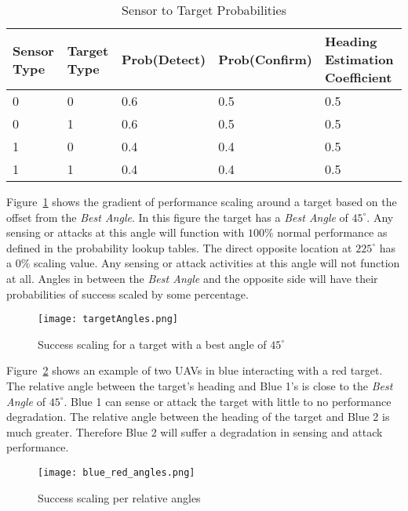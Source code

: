 \begin{table}[H]
	\caption{Sensor to Target Probabilities}
	\centering
	\label{tab:snsrTgtProb}
	\begin{tabular}{|p{1cm}|p{1cm}|p{1cm}|p{1cm}|p{1cm}|}
		\hline
		Sensor Type & Target Type & Prob(Detect) & Prob(Confirm) & Heading Estimation Coefficient\\ \hline
		0 & 0 & 0.6 & 0.5 & 0.5 \\
		0 & 1 & 0.6 & 0.5 & 0.5 \\
		1 & 0 & 0.4 & 0.4 & 0.5 \\
		1 & 1 & 0.4 & 0.4 & 0.5 \\
		\hline
	\end{tabular}
\end{table}

Figure~\ref{fig:targetAngles} shows the gradient of performance scaling around a target based on the offset from the \textit{Best Angle}.  In this figure the target has a \textit{Best Angle} of $45^{\circ}$.  Any sensing or attacks at this angle will function with $100\%$ normal performance as defined in the probability lookup tables.  The direct opposite location at $225^{\circ}$ has a $0\%$ scaling value.  Any sensing or attack activities at this angle will not function at all.  Angles in between the \textit{Best Angle} and the opposite side will have their probabilities of success scaled by some percentage.


\begin{figure}[H]
	\centering
	\texttt{[image: targetAngles.png]}
	\caption{Success scaling for a target with a best angle of $45^{\circ}$}
	\label{fig:targetAngles}
\end{figure}

Figure~\ref{fig:blue_red_angles} shows an example of two UAVs in blue interacting with a red target.  The relative angle between the target's heading and Blue 1's is close to the \textit{Best Angle} of $45^{\circ}$.  Blue 1 can sense or attack the target with little to no performance degradation.  The relative angle between the heading of the target and Blue 2 is much greater.  Therefore Blue 2 will suffer a degradation in sensing and attack performance.

\begin{figure}[H]
	\centering
	\texttt{[image: blue\_red\_angles.png]}
	\caption{Success scaling per relative angles}
	\label{fig:blue_red_angles}
\end{figure}

